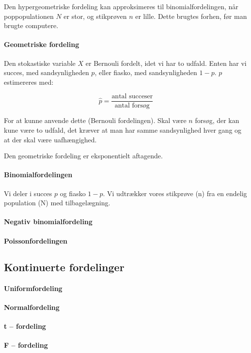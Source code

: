 \documentclass{article}
\begin{document}
Den hypergeometriske fordeling kan approksimeres til binomialfordelingen, når
poppopulationen $N$ er stor, og stikprøven $n$ er lille. Dette brugtes forhen,
før man brugte computere.

\paragraph{Geometriske fordeling}
Den stokastiske variable $X$ er Bernouli fordelt, idet vi har to udfald. Enten
har vi succes, med sandsynligheden $p$, eller fiasko, med sandsynligheden $1-p$.
$p$ estimereres med:

$$\hat{p} = \frac{\text{antal succeser}}{\text{antal forsøg}}$$

For at kunne anvende dette (Bernouli fordelingen). Skal være $n$ forsøg, der kan
kune være to udfald, det kræver at man har samme sandsynlighed hver gang og at
der skal være uafhængighed. 

Den geometriske fordeling er eksponentielt aftagende.
\paragraph{Binomialfordelingen}
Vi deler i succes $p$ og fiasko $1-p$. Vi udtrækker vores stikprøve (n) fra en
endelig population (N) med tilbagelægning.


\paragraph{Negativ binomialfordeling}
\paragraph{Poissonfordelingen}

\subsection{Kontinuerte fordelinger}
\paragraph{Uniformfordeling}
\paragraph{Normalfordeling}
\paragraph{t – fordeling}
\paragraph{F – fordeling}
\end{document}
